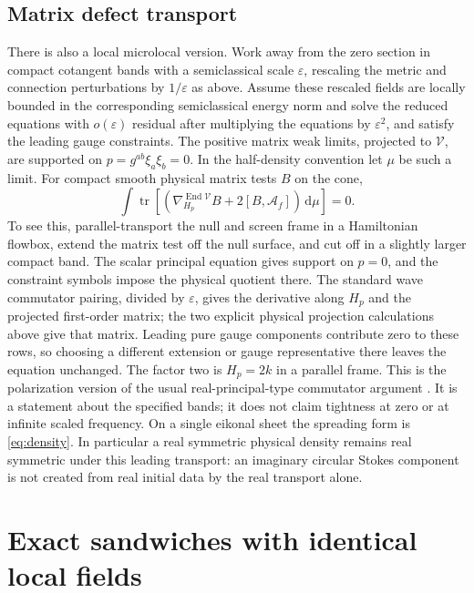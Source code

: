 \documentclass[11pt]{article}
\newcommand{\dd}{\mathrm d}
\newcommand{\tr}{\operatorname{tr}}
\newcommand{\eps}{\varepsilon}
\begin{document}
\subsection{Matrix defect transport}
There is also a local microlocal version. Work away from the zero section in compact cotangent bands with a semiclassical scale \(\eps\), rescaling the metric and connection perturbations by \(1/\eps\) as above. Assume these rescaled fields are locally bounded in the corresponding semiclassical energy norm and solve the reduced equations with \(o(\eps)\) residual after multiplying the equations by \(\eps^2\), and satisfy the leading gauge constraints. The positive matrix weak limits, projected to \(\mathcal V\), are supported on \(p=g^{ab}\xi_a\xi_b=0\). In the half-density convention let \(\mu\) be such a limit. For compact smooth physical matrix tests \(B\) on the cone,
\begin{equation}\label{eq:micro}
 \int \tr\!\left[
  \left(\nabla^{\operatorname{End}\mathcal V}_{H_p}B+
         2[B,\mathcal A_f]\right)\,\dd\mu\right]=0.
\end{equation}
To see this, parallel-transport the null and screen frame in a Hamiltonian flowbox, extend the matrix test off the null surface, and cut off in a slightly larger compact band. The scalar principal equation gives support on \(p=0\), and the constraint symbols impose the physical quotient there. The standard wave commutator pairing, divided by \(\eps\), gives the derivative along \(H_p\) and the projected first-order matrix; the two explicit physical projection calculations above give that matrix. Leading pure gauge components contribute zero to these rows, so choosing a different extension or gauge representative there leaves the equation unchanged. The factor two is \(H_p=2k\) in a parallel frame. This is the polarization version of the usual real-principal-type commutator argument \cite{dencker,gerard}. It is a statement about the specified bands; it does not claim tightness at zero or at infinite scaled frequency. On a single eikonal sheet the spreading form is \eqref{eq:density}. In particular a real symmetric physical density remains real symmetric under this leading transport: an imaginary circular Stokes component is not created from real initial data by the real transport alone.

\section{Exact sandwiches with identical local fields}
\end{document}
